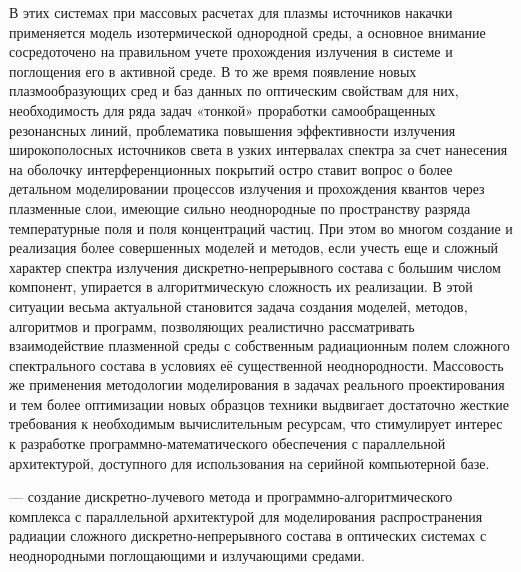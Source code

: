 В этих системах при массовых расчетах для плазмы источников накачки применяется модель изотермической однородной среды, а основное внимание сосредоточено на правильном учете прохождения излучения в системе и поглощения его в активной среде.
В то же время появление новых плазмообразующих сред и баз данных по оптическим свойствам для них, необходимость для ряда задач «тонкой» проработки самообращенных резонансных линий, проблематика повышения эффективности излучения широкополосных источников света в узких интервалах спектра за счет нанесения на оболочку интерференционных покрытий остро ставит вопрос о более детальном моделировании процессов излучения и прохождения квантов через плазменные слои, имеющие сильно неоднородные по пространству разряда температурные поля и поля концентраций частиц.
При этом во многом создание и реализация более совершенных моделей и методов, если учесть еще и сложный характер спектра излучения дискретно-непрерывного состава с большим числом компонент,  упирается в алгоритмическую сложность их реализации.
В этой ситуации весьма актуальной становится задача создания моделей, методов, алгоритмов и программ, позволяющих реалистично рассматривать взаимодействие плазменной среды с собственным радиационным полем сложного спектрального состава  в условиях её существенной неоднородности.
Массовость же применения методологии моделирования в задачах реального проектирования и тем более  оптимизации новых образцов техники выдвигает достаточно жесткие требования к необходимым  вычислительным ресурсам, что стимулирует интерес к разработке программно-математического обеспечения с параллельной архитектурой, доступного для использования на серийной компьютерной базе.

 — создание дискретно-лучевого метода и программно-алгоритмического комплекса с параллельной архитектурой для моделирования распространения радиации сложного дискретно-непрерывного состава в оптических системах с неоднородными поглощающими и излучающими средами.



